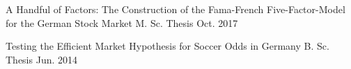

\begin{cventries}

  \cventry
    {A Handful of Factors: The Construction of the Fama-French Five-Factor-Model for the German Stock Market} %
    {M. Sc. Thesis}
    {} %
    {Oct. 2017} %
    {}

  \cventry
    {Testing the Efficient Market Hypothesis for Soccer Odds in Germany} %
    {B. Sc. Thesis}
    {} %
    {Jun. 2014} %
    {}


\end{cventries}
